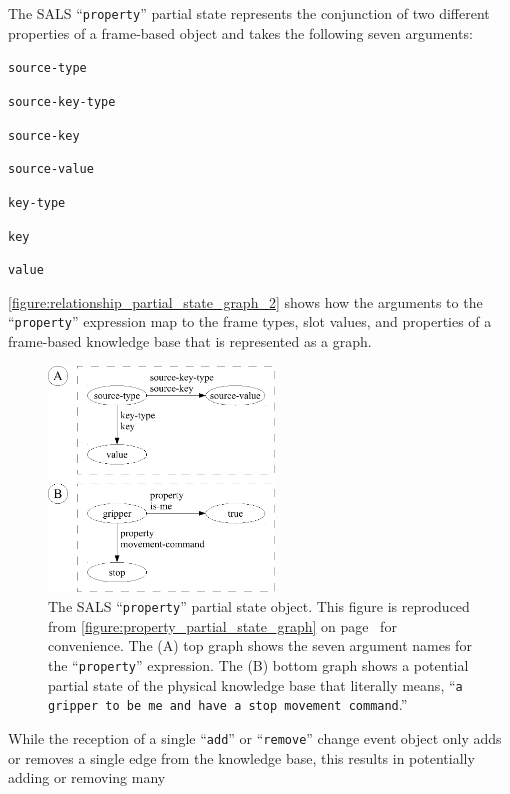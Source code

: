 The SALS ``{\tt{property}}'' partial state represents the conjunction
of two different properties of a frame-based object and takes the
following seven arguments:
\begin{packed_enumerate}
\item{{\tt{source-type}}}
\item{{\tt{source-key-type}}}
\item{{\tt{source-key}}}
\item{{\tt{source-value}}}
\item{{\tt{key-type}}}
\item{{\tt{key}}}
\item{{\tt{value}}}
\end{packed_enumerate}
{\mbox{\autoref{figure:relationship_partial_state_graph_2}}} shows how
the arguments to the ``{\tt{property}}'' expression map to the frame
types, slot values, and properties of a frame-based knowledge base
that is represented as a graph.
\begin{figure}
\centering
\includegraphics[width=6cm]{gfx/property_partial_state_graph-handdrawn}
\caption[The SALS ``{\tt{property}}'' partial state object.
  (Reproduced from
  {\mbox{\autoref{figure:property_partial_state_graph}}})]{The SALS
  ``{\tt{property}}'' partial state object.  This figure is reproduced
  from {\mbox{\autoref{figure:property_partial_state_graph}}} on
  {\mbox{page~\pageref{figure:property_partial_state_graph}}} for
  convenience.  The (A) top graph shows the seven argument names for
  the ``{\tt{property}}'' expression.  The (B) bottom graph shows a
  potential partial state of the physical knowledge base that
  literally means, ``{\tt{a gripper to be me and have a stop movement
      command}}.''}
\label{figure:property_partial_state_graph_2}
\end{figure}
While the reception of a single ``{\tt{add}}'' or ``{\tt{remove}}''
change event object only adds or removes a single edge from the
knowledge base, this results in potentially adding or removing many
